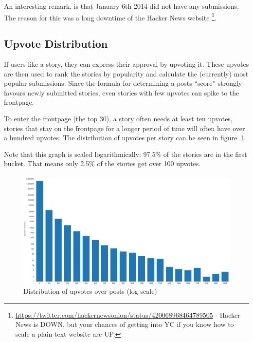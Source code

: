 An interesting remark, is that January 6th 2014 did not have any submissions. The reason for this was a long downtime of the Hacker News website
\footnote{\url{https://twitter.com/hackernewsonion/status/420068968464789505} - Hacker News is DOWN, but your chances of getting into YC if you know how to scale a plain text website are UP.}.

\subsection{Upvote Distribution}
If users like a story, they can express their approval by upvoting it. These upvotes are then used to rank the stories by popularity and calculate the (currently) most popular submissions. Since the formula for determining a posts ``score'' strongly favours newly submitted stories, even stories with few upvotes can spike to the frontpage.

To enter the frontpage (the top 30), a story often needs at least ten upvotes, stories that stay on the frontpage for a longer period of time will often have over a hundred upvotes. The distribution of upvotes per story can be seen in figure~\ref{fig:upvoteDistribution}.

Note that this graph is scaled logarithmically: 97.5\% of the stories are in the first bucket. That means only 2.5\% of the stories get over 100 upvotes.

\begin{figure}[ht!]
	\caption{Distribution of upvotes over posts (log scale)}
	\label{fig:upvoteDistribution}
	\centering
	\includegraphics[width=12cm]{upvote_distribution}
\end{figure}


